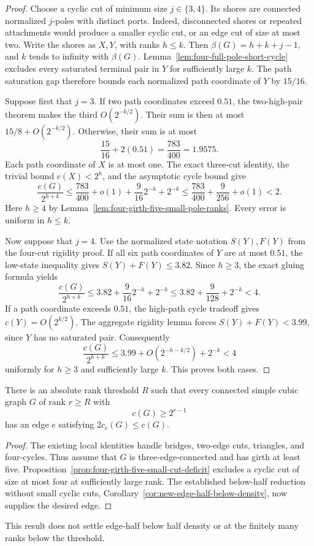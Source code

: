 \begin{proof}
Choose a cyclic cut of minimum size $j\in\{3,4\}$.
Its shores are connected normalized $j$-poles with distinct ports.
Indeed, disconnected shores or repeated attachments would produce a smaller cyclic cut, or an edge cut of size at most two.
Write the shores as $X,Y$, with ranks $h\le k$.
Then $\beta(G)=h+k+j-1$, and $k$ tends to infinity with $\beta(G)$.
Lemma~\ref{lem:four-full-pole-short-cycle} excludes every saturated terminal pair in $Y$ for sufficiently large $k$.
The path saturation gap therefore bounds each normalized path coordinate of $Y$ by $15/16$.

Suppose first that $j=3$.
If two path coordinates exceed $0.51$, the two-high-pair theorem makes the third $O(2^{-k/2})$.
Their sum is then at most $15/8+O(2^{-k/2})$.
Otherwise, their sum is at most
\[
 \frac{15}{16}+2(0.51)=\frac{783}{400}=1.9575.
\]
Each path coordinate of $X$ is at most one.
The exact three-cut identity, the trivial bound $c(X)<2^h$, and the asymptotic cycle bound give
\[
 \frac{c(G)}{2^{h+k}}
 \le \frac{783}{400}+o(1)+\frac9{16}2^{-h}+2^{-k}
 \le \frac{783}{400}+\frac9{256}+o(1)<2.
\]
Here $h\ge4$ by Lemma~\ref{lem:four-girth-five-small-pole-ranks}.
Every error is uniform in $h\le k$.

Now suppose that $j=4$.
Use the normalized state notation $S(Y),F(Y)$ from the four-cut rigidity proof.
If all six path coordinates of $Y$ are at most $0.51$, the low-state inequality gives $S(Y)+F(Y)\le3.82$.
Since $h\ge3$, the exact gluing formula yields
\[
 \frac{c(G)}{2^{h+k}}
 \le3.82+\frac9{16}2^{-h}+2^{-k}
 \le3.82+\frac9{128}+2^{-k}<4.
\]
If a path coordinate exceeds $0.51$, the high-path cycle tradeoff gives $c(Y)=O(2^{k/2})$.
The aggregate rigidity lemma forces $S(Y)+F(Y)<3.99$, since $Y$ has no saturated pair.
Consequently
\[
 \frac{c(G)}{2^{h+k}}
 \le3.99+O(2^{-h-k/2})+2^{-k}<4
\]
uniformly for $h\ge3$ and sufficiently large $k$.
This proves both cases.
\end{proof}

\begin{corollary}\label{cor:four-dense-edge-half}
There is an absolute rank threshold $R$ such that every connected simple cubic graph $G$ of rank $r\ge R$ with
\[
 c(G)\ge2^{r-1}
\]
has an edge $e$ satisfying $2c_e(G)\le c(G)$.
\end{corollary}

\begin{proof}
The existing local identities handle bridges, two-edge cuts, triangles, and four-cycles.
Thus assume that $G$ is three-edge-connected and has girth at least five.
Proposition~\ref{prop:four-girth-five-small-cut-deficit} excludes a cyclic cut of size at most four at sufficiently large rank.
The established below-half reduction without small cyclic cuts, Corollary~\ref{cor:new-edge-half-below-density}, now supplies the desired edge.
\end{proof}

This result does not settle edge-half below half density or at the finitely many ranks below the threshold.

